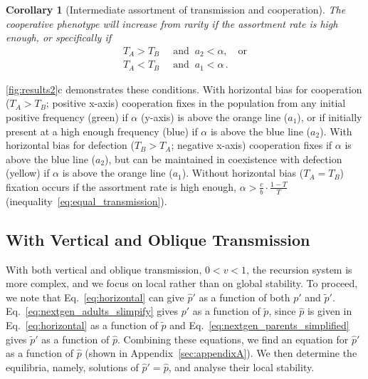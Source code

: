 \documentclass[12pt]{extarticle}
\newtheorem{corollary}{Corollary}
\begin{document}
{\begin{corollary}[Intermediate assortment of transmission and cooperation]
The cooperative phenotype will increase from rarity if the assortment rate is high enough, or specifically if
  \begin{equation} \label{eq:unequal_transmission_from_rarity_in_alpha_terms}
    \begin{aligned}
    T_A > T_B &\;\; \text{and} \;\; a_2 < \alpha, \quad \text{or} \\
    T_A < T_B &\;\; \text{and} \;\; a_1 < \alpha \,.
    \end{aligned}
    \end{equation} 
\end{corollary}

\autoref{fig:results2}c demonstrates these conditions. With horizontal bias for cooperation ($T_A>T_B$; positive x-axis) cooperation fixes in the population from any initial positive frequency (green) if $\alpha$ (y-axis) is above the orange line ($a_1$), or if initially present at a high enough frequency (blue) if $\alpha$ is above the blue line ($a_2$).
With horizontal bias for defection ($T_B>T_A$; negative x-axis) cooperation fixes if $\alpha$ is above the blue line ($a_2$), but can be maintained in coexistence with defection (yellow) if $\alpha$ is above the orange line ($a_1$). Without horizontal bias ($T_A=T_B$) fixation occurs if the assortment rate is high enough, $\alpha > \frac{c}{b} \cdot \frac{1-T}{T}$ (inequality~\ref{eq:equal_transmission}).



\subsection*{With Vertical and Oblique Transmission}

With both vertical and oblique transmission, $0<v<1$, the recursion system is more complex,
and we focus on local rather than on global stability.
To proceed, we note that 
Eq.\ \ref{eq:horizontal} can give $\hat{p}'$ as a function of both $p'$ and $\tilde{p}'$.
Eq.\ \ref{eq:nextgen_adults_slimpify} gives $p'$ as a function of $\tilde{p}$, since $\hat{p}$ is given in Eq.\ \ref{eq:horizontal} as a function of $\tilde{p}$ and 
Eq.\ \ref{eq:nextgen_parents_simplified} gives $\tilde{p}'$ as a function of $\hat{p}$. 
Combining these equations, we find an equation for $\hat{p}'$ as a function of $\hat{p}$ (shown in Appendix~\autoref{sec:appendixA}).
We then determine the equilibria, namely, solutions of $\hat{p}' = \hat{p}$, and analyse their local stability.

}
\end{document}
